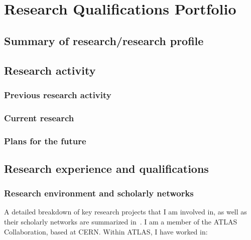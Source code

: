 \chapter{Research Qualifications Portfolio}

\section{Summary of research/research profile} \label{sec:summary-of-research-research-profile}

\section{Research activity} \label{sec:research-activity}

\subsection{Previous research activity}\label{ssec:previous-research-activity}
\subsection{Current research}\label{ssec:current-research}
\subsection{Plans for the future}\label{ssec:plans-for-the-future}

\section{Research experience and qualifications} \label{sec:research-experience-and-qualifications}

\subsection{Research environment and scholarly networks}\label{ssec:research-environment-and-scholarly-networks}

A detailed breakdown of key research projects that I am involved in, as well as their scholarly networks are summarized in~. I am a member of the ATLAS Collaboration, based at CERN. Within ATLAS, I have worked in:

